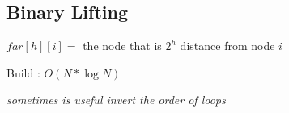 \subsection{Binary Lifting}

$far[h][i] =$ the node that is $2^h$ distance from node $i$

Build : $O(N * \log{N})$

\emph{\footnotesize sometimes is useful invert the order of loops}

